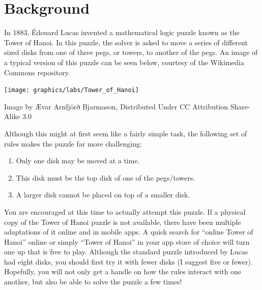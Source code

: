 	\section{Background}
		In 1883, Édouard Lucas invented a mathematical logic puzzle known as the Tower of Hanoi. In this puzzle, the solver is asked to move a series of different sized disks from one of three pegs, or towers, to another of the pegs. An image of a typical version of this puzzle can be seen below, courtesy of the Wikimedia Commons repository.
		\begin{center}
			\texttt{[image: graphics/labs/Tower\_of\_Hanoi]}

			{\tiny Image by Ævar Arnfjörð Bjarmason, Distributed Under CC Attribution Share-Alike 3.0}
		\end{center}
		Although this might at first seem like a fairly simple task, the following set of rules makes the puzzle far more challenging:
		\begin{enumerate}
			\item Only one disk may be moved at a time.
			\item This disk must be the top disk of one of the pegs/towers.
			\item A larger disk cannot be placed on top of a smaller disk.
		\end{enumerate}

		You are encouraged at this time to actually attempt this puzzle. If a physical copy of the Tower of Hanoi puzzle is not available, there have been multiple adaptations of it online and in mobile apps. A quick search for ``online Tower of Hanoi'' online or simply ``Tower of Hanoi'' in your app store of choice will turn one up that is free to play. Although the standard puzzle introduced by Lucas had eight disks, you should first try it with fewer disks (I suggest five or fewer). Hopefully, you will not only get a handle on how the rules interact with one another, but also be able to solve the puzzle a few times!

